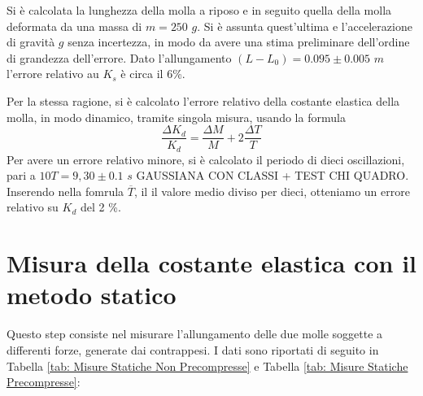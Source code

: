 \documentclass[12pt, a4paper]{article}
\begin{document}
Si è calcolata la lunghezza della molla a riposo e in seguito quella della molla deformata da una massa di $m=250$ $g$.
Si è assunta quest'ultima e l'accelerazione di gravità $g$ senza incertezza, in modo da avere una stima preliminare dell'ordine di grandezza dell'errore.
Dato l'allungamento $(L-L_0)=0.095\pm 0.005$ $m$ l'errore relativo au $K_s$ è circa il $6$\%.

Per la stessa ragione, si è calcolato l'errore relativo della costante elastica della molla, in modo dinamico, tramite singola misura, usando la formula 
\begin{equation*}
    \frac{\Delta K_d}{K_d}=\frac{\Delta M}{M}+2\frac{\Delta T}{T}
\end{equation*}
Per avere un errore relativo minore, si è calcolato il periodo di dieci oscillazioni, pari a $10T= 9,30 \pm 0.1$ $s$  GAUSSIANA CON CLASSI + TEST CHI QUADRO. Inserendo nella fomrula $\overline T$, il il valore medio diviso per dieci, otteniamo un errore relativo su $K_d$ del 2 \%.



\section{Misura della costante elastica con il metodo statico}
Questo step consiste nel misurare l'allungamento delle due molle soggette a differenti forze, generate dai contrappesi. I dati sono riportati di seguito in Tabella \ref{tab: Misure Statiche Non Precompresse} e Tabella \ref{tab: Misure Statiche Precompresse}:
\\
\end{document}

